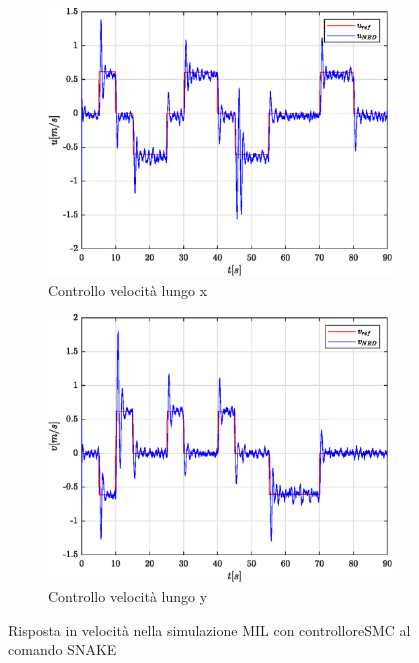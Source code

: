 \begin{figure}
	\centering
	\begin{subfigure}{0.45\textwidth}
		\centering
		\includegraphics[width=1\textwidth]{Simulazioni/Figure/SMC/SNAKE_MIL/PositionControlXVel}
		\caption{Controllo velocità lungo x}
		\label{fig:SNAKEevelxSMC_MIL}
	\end{subfigure}
	\hfill
	\begin{subfigure}{0.45\textwidth}
		\centering
		\includegraphics[width=1\textwidth]{Simulazioni/Figure/SMC/SNAKE_MIL/PositionControlYVel}
		\caption{Controllo velocità lungo y}
		\label{fig:SNAKEevelySMC_MIL}
	\end{subfigure}
	\caption{Risposta in velocità nella simulazione MIL con controlloreSMC al comando SNAKE}
\end{figure}


